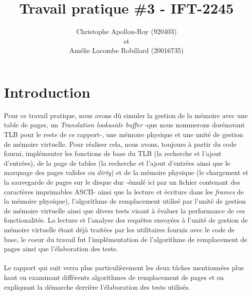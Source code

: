 \documentclass{article}
\title{Travail pratique \#3 - IFT-2245}
\author{Christophe Apollon-Roy (920403) \\et \\Amélie Lacombe Robillard (20016735)}
\begin{document}
\maketitle

\section{Introduction}
\setlength{\parindent}{20pt}
Pour ce travail pratique, nous avons dû simuler la gestion de la mémoire avec une table de pages, un \emph{Translation lookaside buffer} 
-que nous nommerons dorénavant TLB pour le reste de ce rapport-, une mémoire physique et une unité de gestion de mémoire virtuelle. Pour réaliser 
cela, nous avons, toujours à partir du code fourni, implémenter les fonctions de base du TLB (la recherche et l'ajout d'entrées), de la page de 
tables (la recherche et l'ajout d'entrées ainsi que le marquage des pages valides ou \emph{dirty}) et de la mémoire physique (le chargement et la 
sauvegarde de pages sur le disque dur -émulé ici par un fichier contenant des caractères imprimables ASCII- ainsi que la lecture et écriture dans 
les \emph{frames} de la mémoire physique), l'algorithme de remplacement utilisé par l'unité de gestion de mémoire virtuelle ainsi que divers 
tests visant à évaluer la performance de ces fonctionalités. La lecture et l'analyse des requêtes envoyées à l'unité de gestion de mémoire 
virtuelle étant déjà traitées par les utilitaires fournis avec le code de base, le coeur du travail fut l'implémentation de l'algorithme de 
remplacement de pages ainsi que l'élaboration des tests.\\
\\
Le rapport qui suit verra plus particulièrement les deux tâches mentionnées plus haut en examinant différents algorithmes de remplacement de 
pages et en expliquant la démarche derrière l'élaboration des tests utilisés.\\
\\
\end{document}
